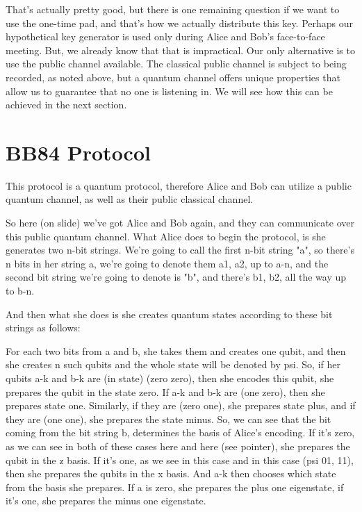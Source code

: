 That's actually pretty good, but there is one remaining question if we want to use the one-time pad, and that's how we actually distribute this key.  Perhaps our hypothetical key generator is used only during Alice and Bob's face-to-face meeting.  But, we already know that that is impractical.  Our only alternative is to use the public channel available.  The classical public channel is subject to being recorded, as noted above, but a quantum channel offers unique properties that allow us to guarantee that no one is listening in.  We will see how this can be achieved in the next section.

\section{BB84 Protocol}

This protocol is a quantum protocol, therefore Alice and Bob can utilize a public quantum channel, as well as their public classical channel.

So here (on slide) we've got Alice and Bob again, and they can communicate over this public quantum channel. What Alice does to begin the protocol, is she generates two n-bit strings. We're going to call the first n-bit string "a", so there's n bits in her string a, we're going to denote them a1, a2, up to a-n, and the second bit string we're going to denote is "b", and there's b1, b2, all the way up to b-n.

And then what she does is she creates quantum states according to these bit strings as follows:

For each two bits from a and b, she takes them and creates one qubit, and then she creates n such qubits and the whole state will be denoted by psi. So, if her qubits a-k and b-k are (in state) (zero zero), then she encodes this qubit, she prepares the qubit in the state zero. If a-k and b-k are (one zero), then she prepares state one. Similarly, if they are (zero one), she prepares state plus, and if they are (one one), she prepares the state minus. So, we can see that the bit coming from the bit string b, determines the basis of Alice's encoding. If it's zero, as we can see in both of these cases here and here (see pointer), she prepares the qubit in the z basis. If it's one, as we see in this case and in this case (psi 01, 11), then she prepares the qubits in the x basis. And a-k then chooses which state from the basis she prepares. If a is zero, she prepares the plus one eigenstate, if it's one, she prepares the minus one eigenstate.

